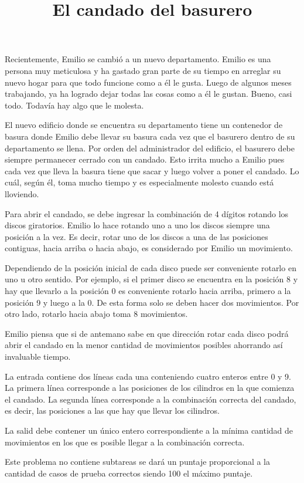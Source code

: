 \documentclass{oci}
\title{El candado del basurero}
\begin{document}
\begin{problemDescription}
  Recientemente, Emilio se cambió a un nuevo departamento.
  Emilio es una persona muy meticulosa y ha gastado gran parte de su tiempo en arreglar su
  nuevo hogar para que todo funcione como a él le gusta.
  Luego de algunos meses trabajando, ya ha logrado dejar todas las cosas como a él le gustan.
  Bueno, casi todo.
  Todavía hay algo que le molesta.

  El nuevo edificio donde se encuentra su departamento tiene un contenedor de basura donde Emilio
  debe llevar su basura cada vez que el basurero dentro de su departamento se llena.
  Por orden del administrador del edificio, el basurero debe siempre permanecer cerrado con un
  candado.
  Esto irrita mucho a Emilio pues cada vez que lleva la basura tiene que sacar y luego volver a
  poner el candado.
  Lo cuál, según él, toma mucho tiempo y es especialmente molesto cuando está lloviendo.

  Para abrir el candado, se debe ingresar la combinación de 4 dígitos rotando los discos
  giratorios.
  Emilio lo hace rotando uno a uno los discos siempre una posición a la vez.
  Es decir, rotar uno de los discos a una de las posiciones contiguas, hacia arriba o hacia abajo, es
  considerado por Emilio un movimiento.

  Dependiendo de la posición inicial de cada disco puede ser conveniente rotarlo en uno u otro
  sentido.
  Por ejemplo, si el primer disco se encuentra en la posición 8 y hay que llevarlo a la posición 0 es
  conveniente rotarlo hacia arriba, primero a la posición 9 y luego a la 0.
  De esta forma solo se deben hacer dos movimientos.
  Por otro lado, rotarlo hacia abajo toma 8 movimientos.

  Emilio piensa que si de antemano sabe en que dirección rotar cada disco podrá abrir el candado en
  la menor cantidad de movimientos posibles ahorrando así invaluable tiempo.
\end{problemDescription}

\begin{inputDescription}
  La entrada contiene dos líneas cada una conteniendo cuatro enteros entre 0 y 9.
  La primera línea corresponde a las posiciones de los cilindros en la que comienza el candado.
  La segunda línea corresponde a la combinación correcta del candado, es decir, las posiciones a las
  que hay que llevar los cilindros.
\end{inputDescription}

\begin{outputDescription}
  La salid debe contener un único entero correspondiente a la mínima cantidad de movimientos en los
  que es posible llegar a la combinación correcta.
\end{outputDescription}

\begin{scoreDescription}
  Este problema no contiene subtareas se dará un puntaje proporcional a la cantidad de casos de
  prueba correctos siendo 100 el máximo puntaje.
\end{scoreDescription}

\begin{sampleDescription}
\end{sampleDescription}
\end{document}
